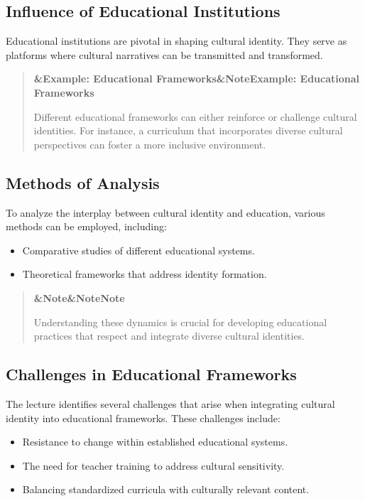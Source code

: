 \documentclass[a4paper]{article}
\newcommand{\boxheading}[1]{%
  \par\smallskip
  \noindent\textbf{\ifx&#1&Note\else#1\fi}\par
  \smallskip
}
\newenvironment{exbox}[1][]{%
  \begin{quote}\color{brown!70!black}\boxheading{#1}\normalcolor
}{\end{quote}}
\newenvironment{rembox}[1][]{%
  \begin{quote}\color{black!70}\boxheading{#1}\normalcolor
}{\end{quote}}
\begin{document}
\subsection{Influence of Educational Institutions}
Educational institutions are pivotal in shaping cultural identity. They serve as platforms where cultural narratives can be transmitted and transformed.

\begin{exbox}[Example: Educational Frameworks]
Different educational frameworks can either reinforce or challenge cultural identities. For instance, a curriculum that incorporates diverse cultural perspectives can foster a more inclusive environment.
\end{exbox}

\subsection{Methods of Analysis}
To analyze the interplay between cultural identity and education, various methods can be employed, including:

\begin{itemize}
    \item Comparative studies of different educational systems.
    \item Theoretical frameworks that address identity formation.
\end{itemize}

\begin{rembox}[Note]
Understanding these dynamics is crucial for developing educational practices that respect and integrate diverse cultural identities.
\end{rembox}

\subsection{Challenges in Educational Frameworks}
The lecture identifies several challenges that arise when integrating cultural identity into educational frameworks. These challenges include:

\begin{itemize}
    \item Resistance to change within established educational systems.
    \item The need for teacher training to address cultural sensitivity.
    \item Balancing standardized curricula with culturally relevant content.
\end{itemize}
\end{document}
